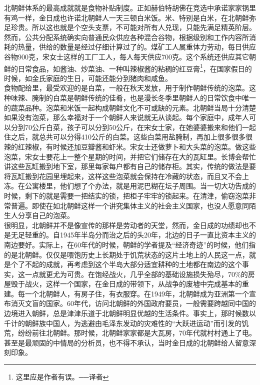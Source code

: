 北朝鲜体系的最高成就就是食物补贴制度。正如赫伯特胡佛在竞选中承诺家家锅里有鸡一样，金日成也许诺北朝鲜人一天三顿白米饭。米、特别是白米，在北朝鲜弥足珍贵。所以这也就是个空头支票，不可能对所有人兑现，只能先满足精英阶层。然而，公共分配系统确实向普通民众供应各种混合谷物，根据级别和工作内容所消耗的热量，供给的数量是经过仔细计算过了的。煤矿工人属重体力劳动，每日供应谷物900克，宋女士这样的工厂工人，每人每天供应700克。这个系统还供应其它朝鲜的日常食品，如酱油、炒菜油、一种叫辣椒酱的粘稠的红豆膏\footnote{这里应是作者有误。──译者}，在国家假日的时候，如金氏家庭的生日，可能还能分到猪肉和咸鱼。\\

食物配给里，最受欢迎的是白菜，一般在秋天发放，用于制作朝鲜传统的泡菜。这种味辣、腌制的白菜是朝鲜传统的佳肴，也是漫长冬季里朝鲜人的日常饮食中唯一的蔬菜品种。泡菜和米饭一起构成朝鲜文化不可或缺的元素。北朝鲜当局十分清楚如果没有泡菜，那么幸福对于一个朝鲜人来说就无从谈起。每个家庭中，成年人可以分到70公斤白菜，孩子可以分到50公斤，在宋女士家，在她婆婆搬来和他们一起住之后，就总共可以分得410公斤的白菜。这些白菜用盐腌制，再加上很多很多很辣的红辣椒，有时候还加豆瓣酱和虾米。宋女士还做萝卜和大头菜的泡菜。做这些泡菜，宋女士要花上一整个星期的时间，并把它们储存在大的瓦缸里。长博会帮忙讲这些瓦缸搬到地下室，那里每家每户都有自己的储存柜。其实，传统的做法是要将瓦缸搬到花园里埋起来，这样这些泡菜就会保持在冷藏的状态，而且又不会上冻。在公寓楼里，他们想了个办法，就是用泥巴糊在坛子周围。当一切大功告成的时候，剩下的就是需要一把结实的锁，把柜子牢牢的锁起来。在清津，偷窃泡菜非常普遍。即使在如北朝鲜这样一个讲究集体主义的社会主义国家，也没人愿意同陌生人分享自己的泡菜。\\

很明显，北朝鲜并不是像宣传的那样是劳动者的天堂，然而，金日成的功绩却也不是无足轻重的。自1945年半岛分而治之后的头20年，北边的日子一直比资本主义的南边要好。实际上，在60年代的时候，朝鲜的学者提及“经济奇迹”的时候，他们指的是北朝鲜。仅仅是喂饱历史上长期处于饥荒状态的这片土地上的人民这一点，就是个了不起的成就，再考虑到这个半岛大部分适宜耕种的土地都在南边的这个事实，这一点就更尤为可贵。在饱经战火，几乎全部的基础设施损失殆尽，70\%的房屋毁于战火，这样一个国家，在金日成的带领下，从战争的废墟中完成基本的重建。每一个北朝鲜人，有房子住，有衣服穿。在1949年，北朝鲜成为亚洲第一个宣布消灭文盲的国家。60年代，访问北朝鲜的外国政府要员，一般需要跨越同中国的边境进入朝鲜，总是津津乐道于北朝鲜明显优越的生活条件。事实上，那时候数以千计的朝鲜族中国人，为逃避由毛泽东发动的灾难性的“大跃进运动”而引发的饥荒，纷纷前往北朝鲜。那时候，北朝鲜家家都是大瓦房，70年代就村村通上了电。甚至是最顽固的中情局的分析员，也不得不承认，当时金日成的北朝鲜给人留意深刻印象。\\

